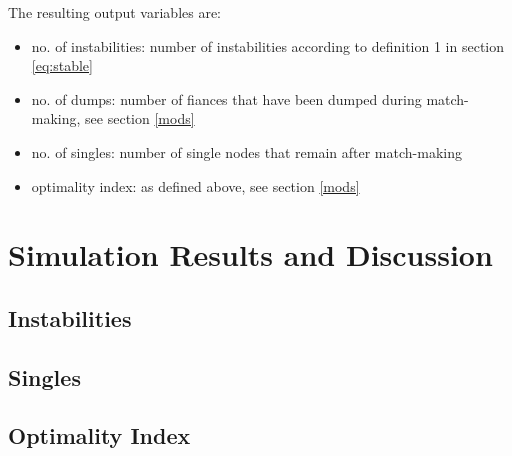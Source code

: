\documentclass[11pt]{article}
\begin{document}
\noindent The resulting output variables are:

\begin{itemize}
  \item no. of instabilities: number of instabilities according to definition 1 in section \ref{eq:stable}
  \item no. of dumps: number of fiances that have been dumped during match-making, see section \ref{mods}
  \item no. of singles: number of single nodes that remain after match-making
  \item optimality index: as defined above, see section \ref{mods}
\end{itemize}

\section{Simulation Results and Discussion}

\subsection{Instabilities}

\subsection{Singles}

\subsection{Optimality Index}
\end{document}
